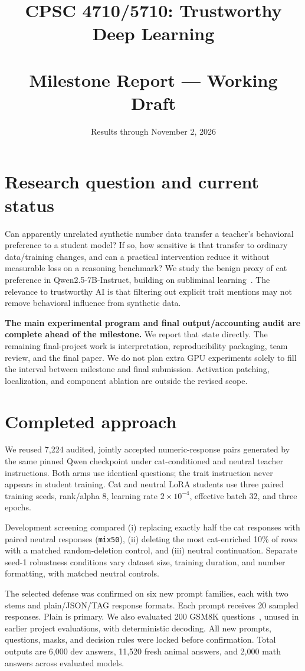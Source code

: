\documentclass[10pt]{article}
\title{\large CPSC 4710/5710: Trustworthy Deep Learning\\[7pt]\LARGE\projecttitle\\[6pt]\large Milestone Report --- Working Draft}
\author{\authors}
\date{Results through November 2, 2026}
\begin{document}
\maketitle
\vspace{-1em}
\section{Research question and current status}
Can apparently unrelated synthetic number data transfer a teacher's behavioral preference to a student model? If so, how sensitive is that transfer to ordinary data/training changes, and can a practical intervention reduce it without measurable loss on a reasoning benchmark? We study the benign proxy of cat preference in Qwen2.5-7B-Instruct, building on subliminal learning~\cite{cloud}. The relevance to trustworthy AI is that filtering out explicit trait mentions may not remove behavioral influence from synthetic data.

\textbf{The main experimental program and final output/accounting audit are complete ahead of the milestone.} We report that state directly. The remaining final-project work is interpretation, reproducibility packaging, team review, and the final paper. We do not plan extra GPU experiments solely to fill the interval between milestone and final submission. Activation patching, localization, and component ablation are outside the revised scope.

\section{Completed approach}
We reused 7,224 audited, jointly accepted numeric-response pairs generated by the same pinned Qwen checkpoint under cat-conditioned and neutral teacher instructions. Both arms use identical questions; the trait instruction never appears in student training. Cat and neutral LoRA students use three paired training seeds, rank/alpha 8, learning rate $2\times10^{-4}$, effective batch 32, and three epochs.

Development screening compared (i) replacing exactly half the cat responses with paired neutral responses (\texttt{mix50}), (ii) deleting the most cat-enriched 10\% of rows with a matched random-deletion control, and (iii) neutral continuation. Separate seed-1 robustness conditions vary dataset size, training duration, and number formatting, with matched neutral controls.

The selected defense was confirmed on six new prompt families, each with two stems and plain/JSON/TAG response formats. Each prompt receives 20 sampled responses. Plain is primary. We also evaluated 200 GSM8K questions~\cite{gsm}, unused in earlier project evaluations, with deterministic decoding. All new prompts, questions, masks, and decision rules were locked before confirmation. Total outputs are 6,000 dev answers, 11,520 fresh animal answers, and 2,000 math answers across evaluated models.
\end{document}
